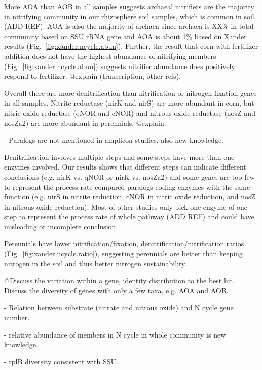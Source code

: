 \documentclass[12pt]{article}
\begin{document}
{More AOA than AOB in all samples suggests archaeal nitrifiers are the majority in nitrifying community in our rhizosphere soil samples, which is common in soil (ADD REF). AOA is also the majority of archaea since archaea is XX\% in total community based on SSU rRNA gene and AOA is about 1\% based on Xander results (Fig.~\ref{fig:xander.ncycle.abun}). Further, the result that corn with fertilizer addition does not have the highest abundance of nitrifying members (Fig.~\ref{fig:xander.ncycle.abun}) suggests nitrifier abundance does positively respond to fertilizer. @explain (transcription, other refs).

Overall there are more denitrification than nitrification or nitrogen fixation genes in all samples. Nitrite reductase (nirK and nirS) are more abundant in corn, but nitric oxide reductase (qNOR and cNOR) and nitrous oxide reductase (nosZ and nosZa2) are more abundant in perennials. @explain. 

- Paralogs are not mentioned in amplicon studies, also new knowledge.

Denitrification involves multiple steps and some steps have more than one enzymes involved.  Our results shows that different steps can indicate different conclusions (e.g. nirK vs. qNOR or nirK vs. nosZa2) and some genes are too few to represent the process rate compared paralogs coding enzymes with the same function (e.g. nirS in nitrite reduction, cNOR in nitric oxide reduction, and nosZ in nitrous oxide reduction). Most of other studies only pick one enzyme of one step to represent the process rate of whole pathway (ADD REF) and could have misleading or incomplete conclusion.

Perennials have lower nitrification/fixation, denitrification/nitrification ratios (Fig.~\ref{fig:xander.ncycle.ratio}), suggesting perennials are better than keeping nitrogen in the soil and thus better nitrogen sustainability.

@Discuss the variation within a gene, identity distribution to the best hit. Discuss the diversity of genes with only a few taxa, e.g. AOA and AOB.

- Relation between substrate (nitrate and nitrous oxide) and N cycle gene number. 

- relative abundance of members in N cycle in whole community is new knowledge.

- rplB diversity consistent with SSU. 

}
\end{document}
